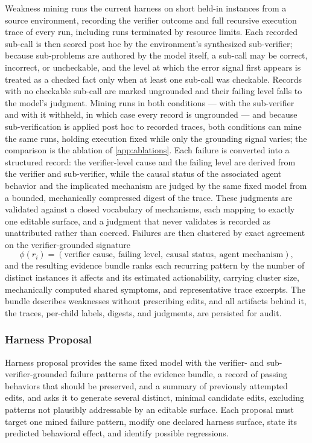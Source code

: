 \documentclass{article}
\begin{document}
Weakness mining runs the current harness on short held-in instances from a source environment, recording the verifier outcome and full recursive execution trace of every run, including runs terminated by resource limits. Each recorded sub-call is then scored post hoc by the environment's synthesized sub-verifier; because sub-problems are authored by the model itself, a sub-call may be correct, incorrect, or uncheckable, and the level at which the error signal first appears is treated as a checked fact only when at least one sub-call was checkable. Records with no checkable sub-call are marked ungrounded and their failing level falls to the model's judgment. Mining runs in both conditions — with the sub-verifier and with it withheld, in which case every record is ungrounded — and because sub-verification is applied post hoc to recorded traces, both conditions can mine the same runs, holding execution fixed while only the grounding signal varies; the comparison is the ablation of \cref{app:ablations}. Each failure is converted into a structured record: the verifier-level cause and the failing level are derived from the verifier and sub-verifier, while the causal status of the associated agent behavior and the implicated mechanism are judged by the same fixed model from a bounded, mechanically compressed digest of the trace. These judgments are validated against a closed vocabulary of mechanisms, each mapping to exactly one editable surface, and a judgment that never validates is recorded as unattributed rather than coerced. Failures are then clustered by exact agreement on the verifier-grounded signature
\begin{equation*}
\phi(r_i)=(\text{verifier cause},\ \text{failing level},\ \text{causal status},\ \text{agent mechanism}),
\end{equation*}
and the resulting evidence bundle ranks each recurring pattern by the number of distinct instances it affects and its estimated actionability, carrying cluster size, mechanically computed shared symptoms, and representative trace excerpts. The bundle describes weaknesses without prescribing edits, and all artifacts behind it, the traces, per-child labels, digests, and judgments, are persisted for audit.
\newpage
\subsubsection{Harness Proposal}
\label{sec:harness-proposal}

Harness proposal provides the same fixed model with the verifier- and sub-verifier-grounded failure patterns of the evidence bundle, a record of passing behaviors that should be preserved, and a summary of previously attempted edits, and asks it to generate several distinct, minimal candidate edits, excluding patterns not plausibly addressable by an editable surface. Each proposal must target one mined failure pattern, modify one declared harness surface, state its predicted behavioral effect, and identify possible regressions.
\end{document}
